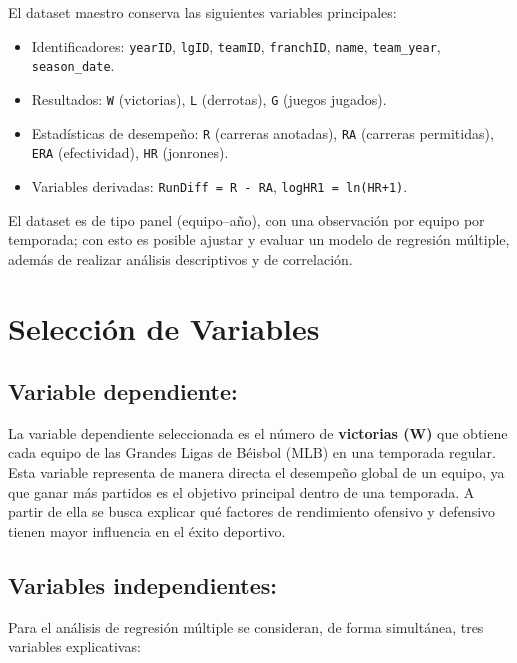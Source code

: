 \documentclass[man,floatsintext]{apa7}
\begin{document}
El dataset maestro conserva las siguientes variables principales:
\begin{itemize}
    \item Identificadores: \texttt{yearID}, \texttt{lgID}, \texttt{teamID}, \texttt{franchID}, \texttt{name}, \texttt{team\_year}, \texttt{season\_date}.
    \item Resultados: \texttt{W} (victorias), \texttt{L} (derrotas), \texttt{G} (juegos jugados).
    \item Estadísticas de desempeño: \texttt{R} (carreras anotadas), \texttt{RA} (carreras permitidas), \texttt{ERA} (efectividad), \texttt{HR} (jonrones).
    \item Variables derivadas: \texttt{RunDiff = R - RA}, \texttt{logHR1 = ln(HR+1)}.
\end{itemize}

El dataset es de tipo panel (equipo–año), con una observación por equipo por temporada; con esto es posible ajustar y evaluar un modelo de regresión múltiple, además de realizar análisis descriptivos y de correlación.
\section{Selección de Variables}
\subsection{Variable dependiente:}
La variable dependiente seleccionada es el número de \textbf{victorias (W)} que obtiene cada equipo de las Grandes Ligas de Béisbol (MLB) en una temporada regular. Esta variable representa de manera directa el desempeño global de un equipo, ya que ganar más partidos es el objetivo principal dentro de una temporada. A partir de ella se busca explicar qué factores de rendimiento ofensivo y defensivo tienen mayor influencia en el éxito deportivo.
\subsection{Variables independientes:}
Para el análisis de regresión múltiple se consideran, de forma simultánea, tres variables explicativas:
\end{document}
